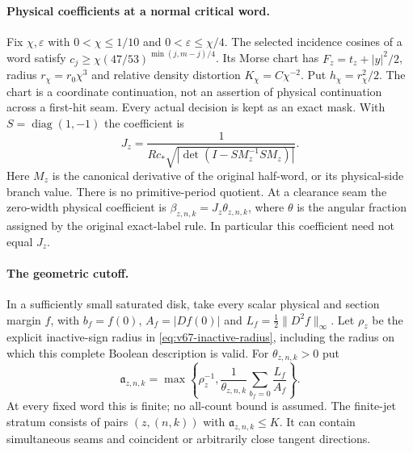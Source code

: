 \paragraph{Physical coefficients at a normal critical word.}
Fix $\chi,\varepsilon$ with $0<\chi\le1/10$ and
$0<\varepsilon\le\chi/4$. The selected incidence cosines of a word
satisfy $c_j\ge\chi(47/53)^{\min(j,m-j)/4}$.
Its Morse chart has $F_z=t_z+|y|^2/2$, radius $r_\chi=r_0\chi^3$
and relative density distortion $K_\chi=C\chi^{-2}$. Put
$h_\chi=r_\chi^2/2$.
The chart is a coordinate continuation, not an assertion of physical
continuation across a first-hit seam. Every actual decision is kept
as an exact mask. With $S=\operatorname{diag}(1,-1)$ the coefficient is
\[
 J_z=\frac{1}{Rc_*\sqrt{|\det(I-SM_z^{-1}SM_z)|}}.
\]
Here $M_z$ is the canonical derivative of the original half-word, or
its physical-side branch value. There is no primitive-period quotient.
At a clearance seam the zero-width physical coefficient is
$\beta_{z,n,k}=J_z\theta_{z,n,k}$, where $\theta$ is the angular
fraction assigned by the original exact-label rule. In particular this
coefficient need not equal $J_z$.

\paragraph{The geometric cutoff.}
In a sufficiently small saturated disk, take every scalar physical and
section margin $f$, with $b_f=f(0)$, $A_f=|Df(0)|$ and
$L_f=\tfrac12\|D^2f\|_\infty$. Let $\rho_z$ be the explicit
inactive-sign radius in \eqref{eq:v67-inactive-radius}, including the
radius on which this complete Boolean description is valid. For
$\theta_{z,n,k}>0$ put
\[
 \mathfrak a_{z,n,k}
 =\max\left\{\rho_z^{-1},\frac{1}{\theta_{z,n,k}}
                   \sum_{b_f=0}\frac{L_f}{A_f}\right\}.
\]
At every fixed word this is finite; no all-count bound is assumed.
The finite-jet stratum consists of pairs $(z,(n,k))$ with
$\mathfrak a_{z,n,k}\le K$. It can contain simultaneous seams and
coincident or arbitrarily close tangent directions.


